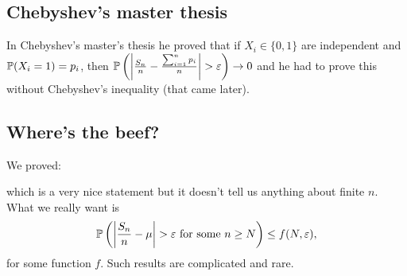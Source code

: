 \subsection{Chebyshev's master thesis}
In Chebyshev's master's thesis he proved that if $X_i \in \{0,1\}$ are independent and ${\mathbb{P}}(X_i = 1)=p_i$, then ${\mathbb{P}}\left({\left\lvert\frac{S_n}{n}-\frac{\sum_{i=1}^n p_i}{n}\right\rvert}>\varepsilon\right)\to 0$ and he had to prove this without Chebyshev's inequality (that came later).
\subsection{Where's the beef?}
We proved:
\begin{center}
\end{center}
which is a very nice statement but it doesn't tell us anything about finite $n$. What we really want is
\[{\mathbb{P}}\left({\left\lvert\frac{S_n}{n}-\mu\right\rvert}> \varepsilon \text{ for some } n \ge N\right) \le f(N,\varepsilon), \]
for some function $f$. Such results are complicated and rare.
